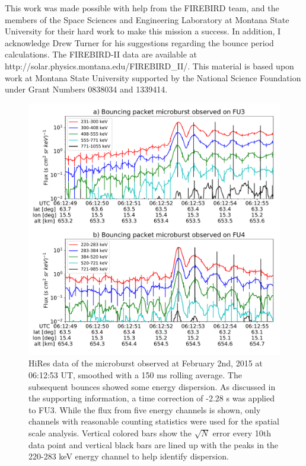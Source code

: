 \documentclass[draft, linenumbers]{agujournal}
\begin{document}
\acknowledgments
This work was made possible with help from the FIREBIRD team, and the members of the Space Sciences and Engineering Laboratory at Montana State University for their hard work to make this mission a success. In addition, I acknowledge Drew Turner for his suggestions regarding the bounce period calculations. The FIREBIRD-II data are available at http://solar.physics.montana.edu/FIREBIRD\_II/. This material is based upon work at Montana State University supported by the National Science Foundation under Grant Numbers 0838034 and 1339414.

\begin{figure}
\includegraphics[width=\textwidth]{hires_plot_log_8pt_smooth_pos_v2.pdf}
\caption{HiRes data of the microburst observed at February 2nd, 2015 at 06:12:53 UT, smoothed with a 150 ms rolling average. The subsequent bounces showed some energy dispersion. As discussed in the supporting information, a time correction of -2.28 s was applied to FU3. While the flux from five energy channels is shown, only channels with reasonable counting statistics were used for the spatial scale analysis. Vertical colored bars show the $\sqrt{N}$ error every 10th data point and vertical black bars are lined up with the peaks in the 220-283 keV energy channel to help identify dispersion.}
\label{hires_plot}
\end{figure}
\end{document}
